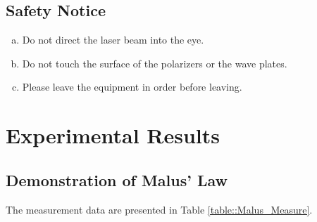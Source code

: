 \documentclass[a4paper]{article}
\begin{document}
\subsection{Safety Notice}

\begin{enumerate}[a.]
	\item Do not direct the laser beam into the eye.
	\item Do not touch the surface of the polarizers or the wave plates.
	\item Please leave the equipment in order before leaving.
\end{enumerate}


\section{Experimental Results}

\subsection{Demonstration of Malus' Law}
The measurement data are presented in Table \ref{table::Malus_Measure}.
\end{document}
